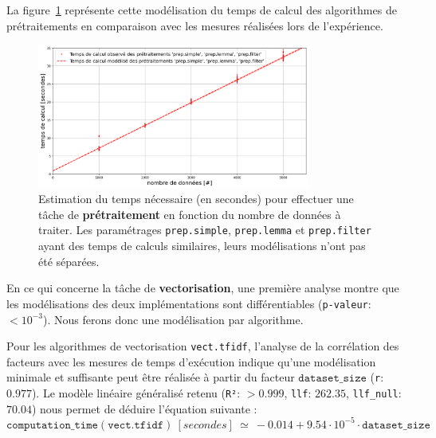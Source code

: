 			La figure~\ref{figure:4.3.2-ETUDE-COUTS-TEMPS-CALCUL-MODELISATION-PREPROCESSING} représente cette modélisation du temps de calcul des algorithmes de prétraitements en comparaison avec les mesures réalisées lors de l'expérience.
			\newline
			\begin{figure}[!htb]
				\centering
				\includegraphics[width=0.8\textwidth]{figures/etude-temps-calcul-modelisation-1prep}
				\caption{Estimation du temps nécessaire (en secondes) pour effectuer une tâche de \textbf{prétraitement} en fonction du nombre de données à traiter. Les paramétrages \texttt{prep.simple}, \texttt{prep.lemma} et \texttt{prep.filter} ayant des temps de calculs similaires, leurs modélisations n'ont pas été séparées.}
				\label{figure:4.3.2-ETUDE-COUTS-TEMPS-CALCUL-MODELISATION-PREPROCESSING}
			\end{figure}
			
			
			En ce qui concerne la tâche de \textbf{vectorisation}, une première analyse montre que les modélisations des deux implémentations sont différentiables  (\texttt{p-valeur}: $< 10^{-3}$). Nous ferons donc une modélisation par algorithme.
		
			Pour les algorithmes de vectorisation \texttt{vect.tfidf}, l'analyse de la corrélation des facteurs avec les mesures de temps d'exécution indique qu'une modélisation minimale et suffisante peut être réalisée à partir du facteur $\texttt{dataset\_size}$ (\texttt{r}: $0.977$).
			Le modèle linéaire généralisé retenu (\texttt{R²}: $> 0.999$, \texttt{llf}: $262.35$, \texttt{llf\_null}: $70.04$) nous permet de déduire l'équation suivante :
			\begin{equation}
				\texttt{computation\_time}(\texttt{vect.tfidf})~[secondes]~
				\simeq~-0.014 + 9.54 \cdot 10^{-5} \cdot \texttt{dataset\_size}
			\end{equation}
			
